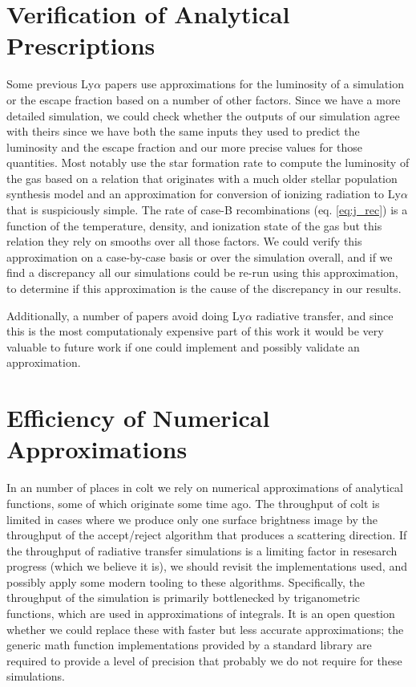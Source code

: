 \section{Verification of Analytical Prescriptions}
Some previous Ly$\alpha$ papers use approximations for the luminosity of a simulation or the escape fraction based on a number of other factors.
Since we have a more detailed simulation, we could check whether the outputs of our simulation agree with theirs since we have both the same inputs they used to predict the luminosity and the escape fraction and our more precise values for those quantities.
Most notably \citet{Cen2013} use the star formation rate to compute the luminosity of the gas based on a relation that originates with a much older stellar population synthesis model and an approximation for conversion of ionizing radiation to Ly$\alpha$ that is suspiciously simple.
The rate of case-B recombinations (eq. \ref{eq:j_rec}) is a function of the temperature, density, and ionization state of the gas but this relation they rely on smooths over all those factors.
We could verify this approximation on a case-by-case basis or over the simulation overall, and if we find a discrepancy all our simulations could be re-run using this approximation, to determine if this approximation is the cause of the discrepancy in our results.

Additionally, a number of papers avoid doing Ly$\alpha$ radiative transfer, and since this is the most computationaly expensive part of this work it would be very valuable to future work if one could implement and possibly validate an approximation.


\section{Efficiency of Numerical Approximations}
In an number of places in {\sc colt} we rely on numerical approximations of analytical functions, some of which originate some time ago.
The throughput of {\sc colt} is limited in cases where we produce only one surface brightness image by the throughput of the accept/reject algorithm that produces a scattering direction.
If the throughput of radiative transfer simulations is a limiting factor in resesarch progress (which we believe it is), we should revisit the implementations used, and possibly apply some modern tooling to these algorithms.
Specifically, the throughput of the simulation is primarily bottlenecked by triganometric functions, which are used in approximations of integrals.
It is an open question whether we could replace these with faster but less accurate approximations; the generic math function implementations provided by a standard library are required to provide a level of precision that probably we do not require for these simulations.

